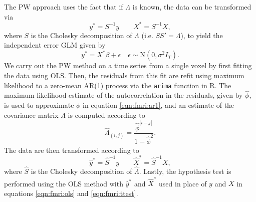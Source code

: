 The PW approach uses the fact that if $\Lambda$ is known, the data can be transformed via
\begin{equation}
y^* = S^{-1}y \qquad X^* = S^{-1}X, \label{eqn:gls:trans}
\end{equation}
where $S$ is the Cholesky decomposition of $\Lambda$ (i.e. $SS' = \Lambda$), to yield the independent error GLM given by
\begin{equation}
y^* = X^*\beta + \epsilon \quad \epsilon \sim \mbox{N}(0,\sigma^2I_T). \label{eqn:gls}
\end{equation}
We carry out the PW method on a time series from a single voxel by first fitting the data using OLS. Then, the residuals from this fit are refit using maximum likelihood to a zero-mean AR(1) process via the {\tt arima} function in R. The maximum likelihood estimate of the autocorrelation in the residuals, given by $\hat{\phi}$, is used to approximate $\phi$ in equation \eqref{eqn:fmri:ar1}, and an estimate of the covariance matrix $\Lambda$ is computed according to
\begin{equation}
\hat{\Lambda}_{(i,j)} = \frac{\hat{\phi}^{|i-j|}}{1-\hat{\phi}^2}. \label{eqn:pw:cor}
\end{equation}
The data are then transformed according to
\begin{equation}
\hat{y}^* = \hat{S}^{-1}y \qquad \hat{X}^* = \hat{S}^{-1}X, \label{eqn:pw:trans}
\end{equation}
where $\hat{S}$ is the Cholesky decomposition of $\hat{\Lambda}$. Lastly, the hypothesis test is performed using the OLS method with $\hat{y}^*$ and $\hat{X}^*$ used in place of $y$ and $X$ in equations \eqref{eqn:fmri:ols} and \eqref{eqn:fmri:ttest}.

